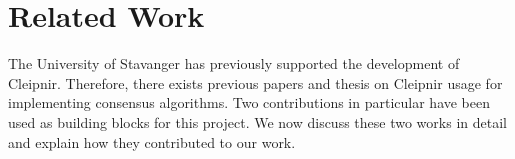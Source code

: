\chapter{Related Work}
\label{chapter:RW}
\iffalse
The University of Stavanger has previously supported the development of Cleipnir.
Therefore, there exists previous papers and thesis on Cleipnir usage for implementing consensus algorithms.
Two contributions in particular have been used as building blocks for this project. We now discuss these two works in detail and explain how they contributed to our work. 
 
